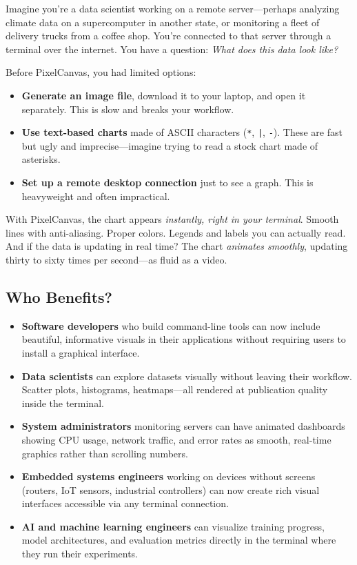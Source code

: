 \documentclass[12pt, a4paper]{article}
\begin{document}
Imagine you're a data scientist working on a remote server---perhaps analyzing climate data on a supercomputer in another state, or monitoring a fleet of delivery trucks from a coffee shop. You're connected to that server through a terminal over the internet. You have a question: \textit{What does this data look like?}

Before PixelCanvas, you had limited options:

\begin{itemize}[leftmargin=1.5em, itemsep=0.5em]
    \item \textbf{Generate an image file}, download it to your laptop, and open it separately. This is slow and breaks your workflow.
    \item \textbf{Use text-based charts} made of ASCII characters (\texttt{*}, \texttt{|}, \texttt{-}). These are fast but ugly and imprecise---imagine trying to read a stock chart made of asterisks.
    \item \textbf{Set up a remote desktop connection} just to see a graph. This is heavyweight and often impractical.
\end{itemize}

With PixelCanvas, the chart appears \emph{instantly, right in your terminal}. Smooth lines with anti-aliasing. Proper colors. Legends and labels you can actually read. And if the data is updating in real time? The chart \emph{animates smoothly}, updating thirty to sixty times per second---as fluid as a video.

\subsection{Who Benefits?}

\begin{itemize}[leftmargin=1.5em, itemsep=0.5em]
    \item \textbf{Software developers} who build command-line tools can now include beautiful, informative visuals in their applications without requiring users to install a graphical interface.

    \item \textbf{Data scientists} can explore datasets visually without leaving their workflow. Scatter plots, histograms, heatmaps---all rendered at publication quality inside the terminal.

    \item \textbf{System administrators} monitoring servers can have animated dashboards showing CPU usage, network traffic, and error rates as smooth, real-time graphics rather than scrolling numbers.

    \item \textbf{Embedded systems engineers} working on devices without screens (routers, IoT sensors, industrial controllers) can now create rich visual interfaces accessible via any terminal connection.

    \item \textbf{AI and machine learning engineers} can visualize training progress, model architectures, and evaluation metrics directly in the terminal where they run their experiments.
\end{itemize}
\end{document}
